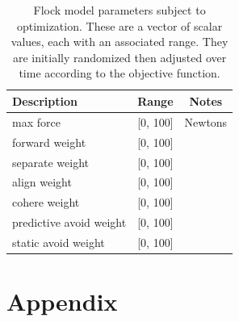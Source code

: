 \documentclass[letterpaper]{article}
\begin{document}
\begin{table}[b]
\centering
\begin{tabular}{ | l | c | c | }
    \hline
    \textbf{Description} & \textbf{Range} & \textbf{Notes} \\
    \hline
    max force & [0, 100] & Newtons \\
    forward weight & [0, 100] &  \\
    separate weight & [0, 100] &  \\
    align weight & [0, 100] &  \\
    cohere weight & [0, 100] &  \\
    predictive avoid weight & [0, 100] &  \\
    static avoid weight & [0, 100] &  \\
    \hline
\end{tabular}
\caption{Flock model parameters subject to optimization. These are a vector of scalar values, each with an associated range. They are initially randomized then adjusted over time according to the objective function.}
\label{table:flock-parameters}
\end{table}







\appendix
\onecolumn
\section{Appendix}
\label{sec:appendix}
\end{document}
